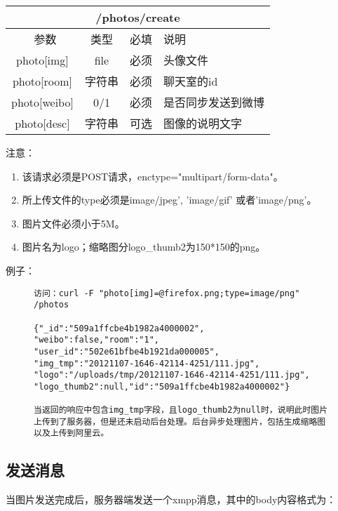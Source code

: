 \documentclass[cs4size]{ctexartutf8}
\begin{document}
\begin{table}[H]
   \begin{center}
\begin{tabular}{|c|c|c|p{12cm}|}
\hline
\multicolumn{4}{|c|}{/photos/create} \\
\hline\hline
 \  参数  & 类型 & 必填 &  说明  \\
\hline
 photo[img]  & file & 必须 &  头像文件\\
 \hline
 photo[room]  & 字符串 & 必须  &  聊天室的id\\
 \hline
 photo[weibo]  & 0/1 & 必须  &  是否同步发送到微博\\
   \hline
 photo[desc]  & 字符串 & 可选  &  图像的说明文字\\
 \hline
\end{tabular}
   \end{center}
\end{table}

注意：

\begin{enumerate}
\item 该请求必须是POST请求，enctype="multipart/form-data"。
\item 所上传文件的type必须是image/jpeg', 'image/gif' 或者'image/png'。
\item 图片文件必须小于5M。
\item 图片名为logo；缩略图分logo\_thumb2为150*150的png。
\end{enumerate}

例子：

\begin{figure}[H]
\begin{verbatim}
访问：curl -F "photo[img]=@firefox.png;type=image/png" 
/photos

{"_id":"509a1ffcbe4b1982a4000002",
"weibo":false,"room":"1",
"user_id":"502e61bfbe4b1921da000005",
"img_tmp":"20121107-1646-42114-4251/111.jpg",
"logo":"/uploads/tmp/20121107-1646-42114-4251/111.jpg",
"logo_thumb2":null,"id":"509a1ffcbe4b1982a4000002"}

当返回的响应中包含img_tmp字段，且logo_thumb2为null时，说明此时图片上传到了服务器，但是还未启动后台处理。后台异步处理图片，包括生成缩略图以及上传到阿里云。

\end{verbatim}
\end{figure}


\subsection{发送消息}
当图片发送完成后，服务器端发送一个xmpp消息，其中的body内容格式为：
\end{document}
